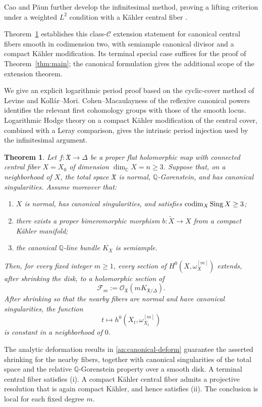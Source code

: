 \documentclass[11pt,a4paper]{article}
\newtheorem{theorem}{Theorem}[section]
\theoremstyle{definition}\newtheorem{definition}[theorem]{Definition}
\theoremstyle{remark}\newtheorem*{remark}{Remark}
\newcommand{\Q}{\mathbb Q}\newcommand{\C}{\mathbb C}
\newcommand{\OO}{\mathcal O}
\newcommand{\cF}{\mathcal F}\newcommand{\cX}{\mathcal X}
\begin{document}
Cao and Păun further develop the infinitesimal method, proving a
lifting criterion under a weighted $L^2$ condition with a Kähler
central fiber \cite[Theorem~1.1]{CaoPaun2023}.

Theorem~\ref{thm:terminal-extension} establishes this class-$\mathcal C$
extension statement for canonical central fibers smooth in codimension
two, with semiample canonical divisor and a compact Kähler modification.
Its terminal special case suffices for the proof
of Theorem~\ref{thm:main}; the canonical formulation gives the
additional scope of the extension theorem.

We give an explicit logarithmic period proof based on the cyclic-cover
method of Levine and Kollár--Mori. Cohen--Macaulayness of the reflexive
canonical powers identifies the relevant first cohomology groups with
those of the smooth locus. Logarithmic Hodge theory on a compact Kähler
modification of the central cover, combined with a Leray comparison,
gives the intrinsic period injection used by the infinitesimal argument.

\begin{theorem}\label{thm:terminal-extension}
Let $f:\mathfrak X\to\Delta$ be a proper flat holomorphic map with connected
central fiber $X=X_0$ of dimension $\dim_\C X=n\ge3$. Suppose that, on a
neighborhood of $X$, the total space $\mathfrak X$ is normal,
$\Q$-Gorenstein, and has canonical singularities. Assume moreover that:
\begin{enumerate}[label=\textup{(\roman*)},leftmargin=*]
\item $X$ is normal, has canonical singularities, and satisfies
      $\operatorname{codim}_X\operatorname{Sing} X\ge3$;
\item there exists a proper bimeromorphic morphism
      $b:\widetilde X\to X$ from a compact Kähler manifold;
\item the canonical $\Q$-line bundle $K_X$ is semiample.
\end{enumerate}
Then, for every fixed integer $m\ge1$, every section of
$H^0(X,\omega_X^{[m]})$ extends, after shrinking the disk, to a holomorphic
section of
\[
 \cF_m:=\OO_{\mathfrak X}(mK_{\mathfrak X/\Delta}).
\]
After shrinking so that the nearby fibers are normal and have canonical
singularities, the function
\[
 t\longmapsto h^0(X_t,\omega_{X_t}^{[m]})
\]
is constant in a neighborhood of $0$.
\end{theorem}

The analytic deformation results in \ref{an:canonical-deform} guarantee
the asserted shrinking for the nearby fibers, together with canonical
singularities of the total space and the relative $\Q$-Gorenstein property
over a smooth disk.
A terminal central fiber satisfies \textup{(i)}. A compact Kähler central
fiber admits a projective resolution that is again compact Kähler, and hence
satisfies \textup{(ii)}. The conclusion is local for each fixed degree $m$.
\end{document}

